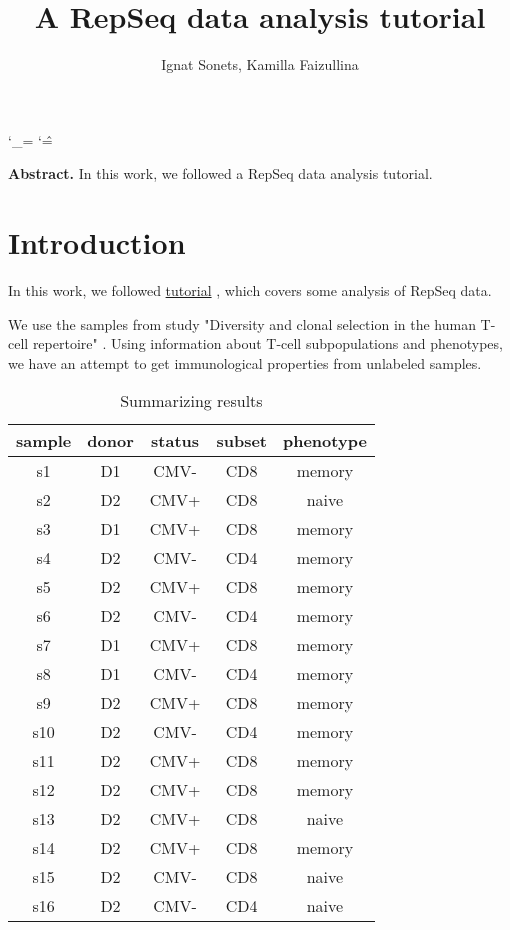 \documentclass{article}
\title{A RepSeq data analysis tutorial }
\author{ Ignat Sonets, Kamilla Faizullina}
\date{\empty}
\begin{document}
 	
 	\catcode`\_=\active
 	\catcode`\^=\active
 	
 	\maketitle
 	
 	\textbf{Abstract.}  In this work, we followed a RepSeq data analysis tutorial.  
 	\section{Introduction}
In this work, we followed \href{https://github.com/antigenomics/repseq-annotation-tutorial}{tutorial} \cite{git}, which covers some analysis of RepSeq data.


We use the samples from study "Diversity and clonal selection in the human T-cell repertoire" \cite{pnas}. Using information about T-cell subpopulations and phenotypes, we have an attempt to get immunological properties from unlabeled samples. 

   	\begin{table}[h]
 	\centering
 	\begin{tabular}{|c|c|c|c|c|}
 		\hline
 	sample &	donor &	status &	subset&	phenotype \\ \hline
 	s1	& D1	&	CMV-		& CD8 &	memory \\ \hline
 	s2	&D2		&CMV+	&	CD8	& naive \\ \hline
 	s3	&D1		&CMV+	&	CD8	& memory\\ \hline
 	s4	&D2		&CMV-	&	CD4	& memory\\ \hline
 	s5	&D2		&CMV+	&	CD8	& memory\\ \hline
 	s6	&D2		&CMV-	&	CD4	& memory\\ \hline
 	s7	&D1		&CMV+	&	CD8	& memory\\ \hline
 	s8	&D1		&CMV-	&	CD4	& memory\\ \hline
 	s9	&D2		&CMV+	&	CD8	& memory\\ \hline
 	s10	&D2		&CMV-	&	CD4	& memory\\ \hline		
 	s11	&D2		&CMV+	&	CD8	& memory\\ \hline
 	s12	&D2		&CMV+	&	CD8 &	memory\\ \hline
 	s13	&D2		&CMV+	&	CD8	&naive\\ \hline
 	s14	&D2		&CMV+	&	CD8	&memory\\ \hline
 	s15	&D2		&CMV-	&	CD8	&naive\\ \hline
 	s16&	D2	&	CMV-	&	CD4	&naive\\ \hline
 		
 		\hline	 
 		
 	\end{tabular}
  	\caption{ Summarizing results  }
  \label{tab:var}
\end{table}
\end{document}

